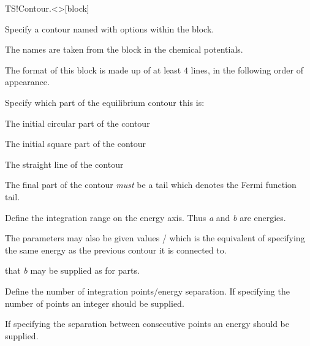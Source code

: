 \begin{fdfentry}{TS!Contour.<>}[block]

  Specify a contour named \fdf*{<>} with options within the block.

  The names \fdf*{<>} are taken from the
   block in the chemical potentials.

  The format of this block is made up of at least $4$ lines, in the
  following order of appearance.

  \begin{fdfoptions}

    \option[part]%

    Specify which part of the equilibrium contour this is:
    \begin{fdfoptions}

      \option[circle]%
      The initial circular part of the contour

      \option[square]%
      The initial square part of the contour

      \option[line]%
      The straight line of the contour

      \option[tail]%
      The final part of the contour \emph{must} be a tail which
      denotes the Fermi function tail.

    \end{fdfoptions}


    Define the integration range on the energy axis.
    Thus \emph{a} and \emph{b} are energies.

    The parameters may also be given values /
    which is the equivalent of specifying the same energy as the
    previous contour it is connected to.

    \note that \emph{b} may be supplied as  for 
    parts.


    Define the number of integration points/energy separation.
    If specifying the number of points an integer should be supplied.

    If specifying the separation between consecutive points an energy
    should be supplied.

    \option[method]%


\end{fdfoptions}
\end{fdfentry}
